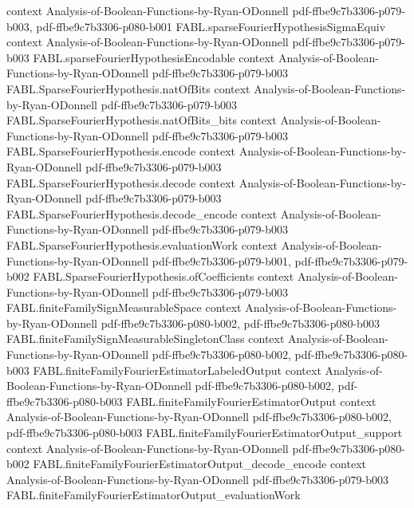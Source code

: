 \begin{theorem}
  {context}
  {Analysis-of-Boolean-Functions-by-Ryan-ODonnell}
  {pdf-ffbe9c7b3306-p079-b003,
    pdf-ffbe9c7b3306-p080-b001}
\proofstep
  {FABL.sparseFourierHypothesisSigmaEquiv}
  {context}
  {Analysis-of-Boolean-Functions-by-Ryan-ODonnell}
  {pdf-ffbe9c7b3306-p079-b003}
\proofstep
  {FABL.sparseFourierHypothesisEncodable}
  {context}
  {Analysis-of-Boolean-Functions-by-Ryan-ODonnell}
  {pdf-ffbe9c7b3306-p079-b003}
\proofstep
  {FABL.SparseFourierHypothesis.natOfBits}
  {context}
  {Analysis-of-Boolean-Functions-by-Ryan-ODonnell}
  {pdf-ffbe9c7b3306-p079-b003}
\proofstep
  {FABL.SparseFourierHypothesis.natOfBits_bits}
  {context}
  {Analysis-of-Boolean-Functions-by-Ryan-ODonnell}
  {pdf-ffbe9c7b3306-p079-b003}
\proofstep
  {FABL.SparseFourierHypothesis.encode}
  {context}
  {Analysis-of-Boolean-Functions-by-Ryan-ODonnell}
  {pdf-ffbe9c7b3306-p079-b003}
\proofstep
  {FABL.SparseFourierHypothesis.decode}
  {context}
  {Analysis-of-Boolean-Functions-by-Ryan-ODonnell}
  {pdf-ffbe9c7b3306-p079-b003}
\proofstep
  {FABL.SparseFourierHypothesis.decode_encode}
  {context}
  {Analysis-of-Boolean-Functions-by-Ryan-ODonnell}
  {pdf-ffbe9c7b3306-p079-b003}
\proofstep
  {FABL.SparseFourierHypothesis.evaluationWork}
  {context}
  {Analysis-of-Boolean-Functions-by-Ryan-ODonnell}
  {pdf-ffbe9c7b3306-p079-b001,
    pdf-ffbe9c7b3306-p079-b002}
\proofstep
  {FABL.SparseFourierHypothesis.ofCoefficients}
  {context}
  {Analysis-of-Boolean-Functions-by-Ryan-ODonnell}
  {pdf-ffbe9c7b3306-p079-b003}
\proofstep
  {FABL.finiteFamilySignMeasurableSpace}
  {context}
  {Analysis-of-Boolean-Functions-by-Ryan-ODonnell}
  {pdf-ffbe9c7b3306-p080-b002,
    pdf-ffbe9c7b3306-p080-b003}
\proofstep
  {FABL.finiteFamilySignMeasurableSingletonClass}
  {context}
  {Analysis-of-Boolean-Functions-by-Ryan-ODonnell}
  {pdf-ffbe9c7b3306-p080-b002,
    pdf-ffbe9c7b3306-p080-b003}
\proofstep
  {FABL.finiteFamilyFourierEstimatorLabeledOutput}
  {context}
  {Analysis-of-Boolean-Functions-by-Ryan-ODonnell}
  {pdf-ffbe9c7b3306-p080-b002,
    pdf-ffbe9c7b3306-p080-b003}
\proofstep
  {FABL.finiteFamilyFourierEstimatorOutput}
  {context}
  {Analysis-of-Boolean-Functions-by-Ryan-ODonnell}
  {pdf-ffbe9c7b3306-p080-b002,
    pdf-ffbe9c7b3306-p080-b003}
\proofstep
  {FABL.finiteFamilyFourierEstimatorOutput_support}
  {context}
  {Analysis-of-Boolean-Functions-by-Ryan-ODonnell}
  {pdf-ffbe9c7b3306-p080-b002}
\proofstep
  {FABL.finiteFamilyFourierEstimatorOutput_decode_encode}
  {context}
  {Analysis-of-Boolean-Functions-by-Ryan-ODonnell}
  {pdf-ffbe9c7b3306-p079-b003}
\proofstep
  {FABL.finiteFamilyFourierEstimatorOutput_evaluationWork}

\end{theorem}
